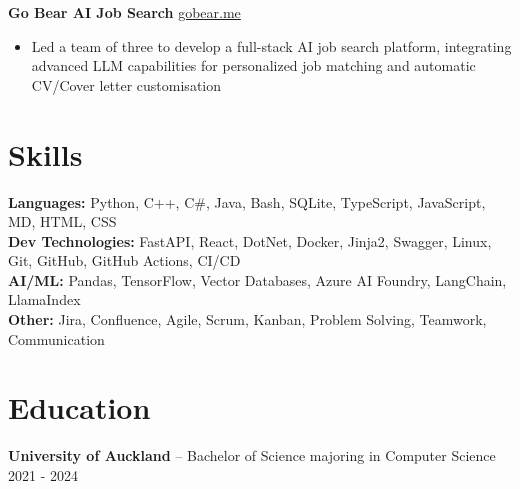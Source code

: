 \documentclass[11pt]{article}       %
\begin{document}
\textbf{Go Bear AI Job Search} \hfill \href{https://gobear.me}{gobear.me} \\
\vspace{-9pt}
\begin{itemize}
    
        \item Led a team of three to develop a full-stack AI job search platform, integrating advanced LLM capabilities for personalized job matching and automatic CV/Cover letter customisation
    \end{itemize}


\vspace{-18.5pt}

\section*{Skills}

\textbf{Languages:} Python, C++, C\#, Java, Bash, SQLite, TypeScript, JavaScript, MD, HTML, CSS \\

\textbf{Dev Technologies:} FastAPI, React, DotNet, Docker, Jinja2, Swagger, Linux, Git, GitHub, GitHub Actions, CI/CD \\

\textbf{AI/ML:} Pandas, TensorFlow, Vector Databases, Azure AI Foundry, LangChain, LlamaIndex \\

\textbf{Other:} Jira, Confluence, Agile, Scrum, Kanban, Problem Solving, Teamwork, Communication \\



\vspace{-6.5pt}

\section*{Education}

\textbf{University of Auckland} -- Bachelor of Science majoring in Computer Science \hfill 2021 - 2024 \\
\end{document}
